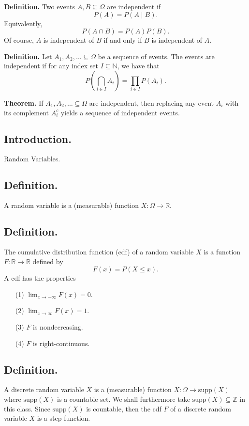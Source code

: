 \documentclass[titlepage]{article}
\begin{document}
\textbf{Definition.} Two events $A, B \subseteq \Omega$ are independent if 
$$P(A) = P(A \mid B).$$
Equivalently, 
$$P(A \cap B) = P(A)P(B).$$ Of course, $A$ is independent of $B$ if and only if $B$ is independent of $A$.

\textbf{Definition.} Let $A_{1}, A_{2}, \ldots \subseteq \Omega$ be a sequence of events. The events are independent if for any index set $I \subseteq \mathbb{N}$, we have that
$$P\left(\bigcap_{i \in I}A_{i}\right) = \prod_{i \in I}P(A_{i}).$$

\textbf{Theorem.} If $A_{1}, A_{2}, \ldots \subseteq \Omega$ are independent, then replacing any event $A_{i}$ with its complement $A_{i}^{c}$ yields a sequence of independent events.

\newpage {}

\subsection{Introduction.} Random Variables.

\subsection{Definition.} A random variable is a (measurable) function $X: \Omega \to \mathbb{R}$.

\subsection{Definition.} The cumulative distribution function (cdf) of a random variable $X$ is a function $F: \mathbb{R} \to \mathbb{R}$ defined by
$$F(x) = P(X \leq x).$$
A cdf has the properties 
\begin{enumerate}
\item[(1)] $\lim_{x \to -\infty}F(x) = 0$.
\item[(2)] $\lim_{x \to \infty}F(x) = 1$.
\item[(3)] $F$ is nondecreasing.
\item[(4)] $F$ is right-continuous.
\end{enumerate}

\subsection{Definition.} A discrete random variable $X$ is a (measurable) function $X: \Omega \to \text{supp}(X)$ where $\text{supp}(X)$ is a countable set. We shall furthermore take $\text{supp}(X) \subseteq \mathbb{Z}$ in this class. Since $\text{supp}(X)$ is countable, then the cdf $F$ of a discrete random variable $X$ is a step function.
\end{document}
